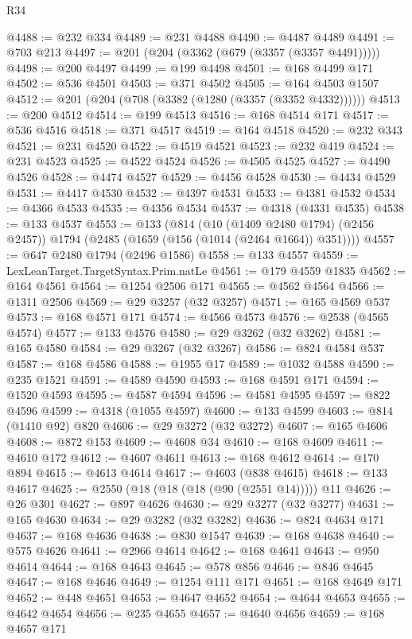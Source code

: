 \begin{lexlean}{R34}
\begin{coremodule}
@4488 := @232 @334
@4489 := @231 @4488
@4490 := @4487 @4489
@4491 := @703 @213
@4497 := @201 (@204 (@3362 (@679 (@3357 (@3357 @4491)))))
@4498 := @200 @4497
@4499 := @199 @4498
@4501 := @168 @4499 @171
@4502 := @536 @4501
@4503 := @371 @4502
@4505 := @164 @4503 @1507
@4512 := @201 (@204 (@708 (@3382 (@1280 (@3357 (@3352 @4332))))))
@4513 := @200 @4512
@4514 := @199 @4513
@4516 := @168 @4514 @171
@4517 := @536 @4516
@4518 := @371 @4517
@4519 := @164 @4518
@4520 := @232 @343
@4521 := @231 @4520
@4522 := @4519 @4521
@4523 := @232 @419
@4524 := @231 @4523
@4525 := @4522 @4524
@4526 := @4505 @4525
@4527 := @4490 @4526
@4528 := @4474 @4527
@4529 := @4456 @4528
@4530 := @4434 @4529
@4531 := @4417 @4530
@4532 := @4397 @4531
@4533 := @4381 @4532
@4534 := @4366 @4533
@4535 := @4356 @4534
@4537 := @4318 (@4331 @4535)
@4538 := @133 @4537
@4553 := @133
    (@814
      (@10 (@1409 @2480 @1794) (@2456 @2457))
      @1794
      (@2485 (@1659 (@156 (@1014 (@2464 @1664)) @351))))
@4557 := @647 @2480 @1794 (@2496 @1586)
@4558 := @133 @4557
@4559 := LexLeanTarget.TargetSyntax.Prim.natLe
@4561 := @179 @4559 @1835
@4562 := @164 @4561
@4564 := @1254 @2506 @171
@4565 := @4562 @4564
@4566 := @1311 @2506
@4569 := @29 @3257 (@32 @3257)
@4571 := @165 @4569 @537
@4573 := @168 @4571 @171
@4574 := @4566 @4573
@4576 := @2538 (@4565 @4574)
@4577 := @133 @4576
@4580 := @29 @3262 (@32 @3262)
@4581 := @165 @4580
@4584 := @29 @3267 (@32 @3267)
@4586 := @824 @4584 @537
@4587 := @168 @4586
@4588 := @1955 @17
@4589 := @1032 @4588
@4590 := @235 @1521
@4591 := @4589 @4590
@4593 := @168 @4591 @171
@4594 := @1520 @4593
@4595 := @4587 @4594
@4596 := @4581 @4595
@4597 := @822 @4596
@4599 := @4318 (@1055 @4597)
@4600 := @133 @4599
@4603 := @814 (@1410 @92) @820
@4606 := @29 @3272 (@32 @3272)
@4607 := @165 @4606
@4608 := @872 @153
@4609 := @4608 @34
@4610 := @168 @4609
@4611 := @4610 @172
@4612 := @4607 @4611
@4613 := @168 @4612
@4614 := @170 @894
@4615 := @4613 @4614
@4617 := @4603 (@838 @4615)
@4618 := @133 @4617
@4625 := @2550 (@18 (@18 (@18 (@90 (@2551 @14))))) @11
@4626 := @26 @301
@4627 := @897 @4626
@4630 := @29 @3277 (@32 @3277)
@4631 := @165 @4630
@4634 := @29 @3282 (@32 @3282)
@4636 := @824 @4634 @171
@4637 := @168 @4636
@4638 := @830 @1547
@4639 := @168 @4638
@4640 := @575 @4626
@4641 := @2966 @4614
@4642 := @168 @4641
@4643 := @950 @4614
@4644 := @168 @4643
@4645 := @578 @856
@4646 := @846 @4645
@4647 := @168 @4646
@4649 := @1254 @111 @171
@4651 := @168 @4649 @171
@4652 := @448 @4651
@4653 := @4647 @4652
@4654 := @4644 @4653
@4655 := @4642 @4654
@4656 := @235 @4655
@4657 := @4640 @4656
@4659 := @168 @4657 @171

\end{coremodule}
\end{lexlean}
